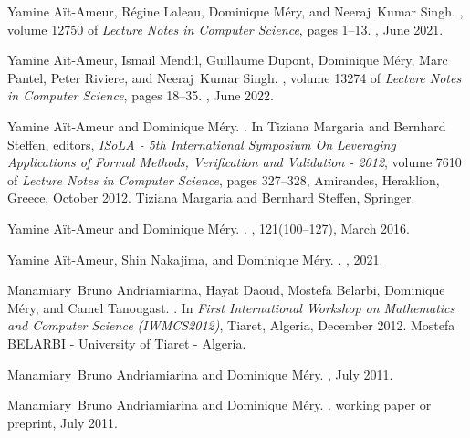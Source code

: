 \documentclass[ 12pt]{article}
\begin{document}
\begin{thebibliography}{100}
Yamine A{\"i}t-Ameur, R{\'e}gine Laleau, Dominique M{\'e}ry, and Neeraj~Kumar
  Singh.
, volume 12750 of {\em Lecture Notes in Computer Science}, pages
  1--13.
, June 2021.

Yamine A{\"i}t-Ameur, Ismail Mendil, Guillaume Dupont, Dominique M{\'e}ry, Marc
  Pantel, Peter Riviere, and Neeraj~Kumar Singh.
,
  volume 13274 of {\em Lecture Notes in Computer Science}, pages 18--35.
, June 2022.

Yamine A{\"i}t-Ameur and Dominique M{\'e}ry.
.
\newblock In Tiziana Margaria and Bernhard Steffen, editors, {\em {ISoLA - 5th
  International Symposium On Leveraging Applications of Formal Methods,
  Verification and Validation - 2012}}, volume 7610 of {\em Lecture Notes in
  Computer Science}, pages 327--328, Amirandes, Heraklion, Greece, October
  2012. {Tiziana Margaria and Bernhard Steffen}, {Springer}.

Yamine A{\"i}t-Ameur and Dominique M{\'e}ry.
.
, 121(100--127), March 2016.

Yamine A{\"i}t-Ameur, Shin Nakajima, and Dominique M{\'e}ry.
.
, 2021.

Manamiary~Bruno Andriamiarina, Hayat Daoud, Mostefa Belarbi, Dominique
  M{\'e}ry, and Camel Tanougast.
.
\newblock In {\em {First International Workshop on Mathematics and Computer
  Science (IWMCS2012)}}, Tiaret, Algeria, December 2012. {Mostefa BELARBI -
  University of Tiaret - Algeria}.

Manamiary~Bruno Andriamiarina and Dominique M{\'e}ry.
, July 2011.

Manamiary~Bruno Andriamiarina and Dominique M{\'e}ry.
.
\newblock working paper or preprint, July 2011.


\end{thebibliography}
\end{document}
